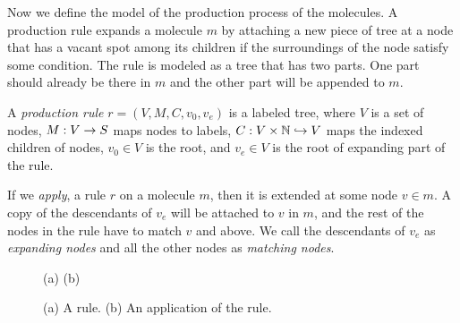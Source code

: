 Now we define the model of the production process of the molecules.
A production rule expands a molecule $m$ by attaching a new piece of tree at a node that has a vacant spot among its children if the surroundings of the
node satisfy some condition.
The rule is modeled as a tree that has two parts.
One part should already be there in $m$ and the other part will be appended to $m$.

\begin{df}
  A {\em production rule} $r = (V, M, C, v_0, v_e)$ is a labeled tree, where
  $V$ is a set of nodes,
  $M : V \rightarrow S$ maps nodes to labels, 
  $C : V \times \mathbb{N} \hookrightarrow V$ maps the indexed children of nodes,
  $v_0 \in V$ is the root, and
  $v_e \in V$ is the root of expanding part of the rule.
\end{df}

If we {\em apply}, a rule $r$ on a molecule $m$, then it is extended at some node
$v \in m$. A copy of the descendants of $v_e$ will be attached to
$v$ in $m$, and the rest of the nodes in the rule have to match $v$ and above.
We call the descendants of $v_e$ as {\em expanding nodes}
and all the other nodes as {\em matching nodes}.


\begin{wrapfigure}{r}{0.37\textwidth}
  \vspace{-12mm}
      \small
  \quad
  \hfill (a) \hfill (b)\hfill\mbox{}
  \caption{(a) A rule. (b) An application of the rule.}
  \label{fig:exrule}
  \vspace{-6mm}
\end{wrapfigure}
